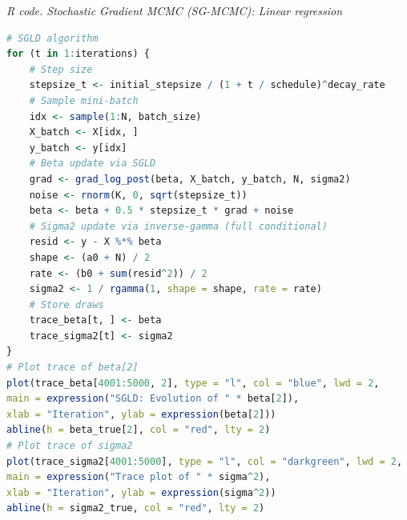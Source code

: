 \begin{enumerate}[leftmargin=*]
\begin{tcolorbox}[enhanced,width=4.67in,center upper,
	fontupper=\large\bfseries,drop shadow southwest,sharp corners]
	\textit{R code. Stochastic Gradient MCMC (SG-MCMC): Linear regression}
	\begin{VF}
		\begin{lstlisting}[language=R]
# SGLD algorithm
for (t in 1:iterations) {
	# Step size
	stepsize_t <- initial_stepsize / (1 + t / schedule)^decay_rate
	# Sample mini-batch
	idx <- sample(1:N, batch_size)
	X_batch <- X[idx, ]
	y_batch <- y[idx]
	# Beta update via SGLD
	grad <- grad_log_post(beta, X_batch, y_batch, N, sigma2)
	noise <- rnorm(K, 0, sqrt(stepsize_t))
	beta <- beta + 0.5 * stepsize_t * grad + noise
	# Sigma2 update via inverse-gamma (full conditional)
	resid <- y - X %*% beta
	shape <- (a0 + N) / 2
	rate <- (b0 + sum(resid^2)) / 2
	sigma2 <- 1 / rgamma(1, shape = shape, rate = rate)
	# Store draws
	trace_beta[t, ] <- beta
	trace_sigma2[t] <- sigma2
}
# Plot trace of beta[2]
plot(trace_beta[4001:5000, 2], type = "l", col = "blue", lwd = 2,
main = expression("SGLD: Evolution of " * beta[2]),
xlab = "Iteration", ylab = expression(beta[2]))
abline(h = beta_true[2], col = "red", lty = 2)
# Plot trace of sigma2
plot(trace_sigma2[4001:5000], type = "l", col = "darkgreen", lwd = 2,
main = expression("Trace plot of " * sigma^2),
xlab = "Iteration", ylab = expression(sigma^2))
abline(h = sigma2_true, col = "red", lty = 2)
\end{lstlisting}
	\end{VF}
\end{tcolorbox}

	

\end{enumerate}